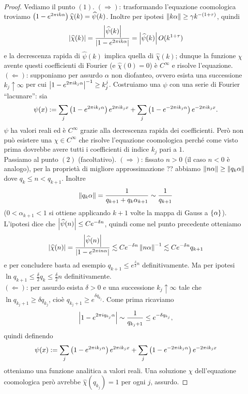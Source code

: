 \begin{proof}Vediamo il punto $(1)$. $(\Rightarrow)$: trasformando l'equazione coomologica troviamo
$\left(1-e^{2\pi i k\alpha}\right)\widehat{\chi}(k)=\widehat{\psi}(k)$. Inoltre per ipotesi
$\left\|k\alpha\right\|\ge\gamma k^{-(1+\tau)}$, quindi
\[ \left|\widehat{\chi}(k)\right|=\frac{\left|\widehat{\psi}(k)\right|}{\left|1-e^{2\pi i k\alpha}\right|}=\left|\widehat{\psi}(k)\right|O(k^{1+\tau}) \]
e la decrescenza rapida di $\widehat{\psi}(k)$ implica quella di $\widehat{\chi}(k)$;
dunque la funzione $\chi$ avente questi coefficienti di Fourier (e $\widehat{\chi}(0)=0$) è $C^\infty$ e risolve l'equazione. \\
$(\Leftarrow)$: supponiamo per assurdo $\alpha$ non diofanteo, ovvero esista una successione $k_j\uparrow\infty$
per cui $\left|1-e^{2\pi i k_j\alpha}\right|^{-1}\ge k_j^j$. Costruiamo una $\psi$ con una serie di Fourier ``lacunare'': sia
\[ \psi(x):=\sum_j \left(1-e^{2\pi i k_j\alpha}\right)e^{2\pi i k_j x}+\sum_j \left(1-e^{-2\pi i k_j\alpha}\right)e^{-2\pi i k_j x}. \]
$\psi$ ha valori reali ed è $C^\infty$ grazie alla decrescenza rapida dei coefficienti.
Però non può esistere una $\chi\in C^\infty$ che risolve l'equazione coomologica perché come visto prima
dovrebbe avere tutti i coefficienti di indice $k_j$ pari a $1$. \\
Passiamo al punto $(2)$ (facoltativo). $(\Rightarrow)$: fissato $n>0$ (il caso $n<0$ è analogo), per la proprietà di migliore approssimazione ??
abbiamo $\left\|n\alpha\right\|\ge\left\|q_k\alpha\right\|$ dove $q_k\le n<q_{k+1}$. Inoltre
\[ \left\|q_k\alpha\right\|=\frac{1}{q_{k+1}+q_k\alpha_{k+1}}\sim\frac{1}{q_{k+1}} \]
($0<\alpha_{k+1}<1$ si ottiene applicando $k+1$ volte la mappa di Gauss a $\left\{\alpha\right\}$).
L'ipotesi dice che $\left|\widehat{\psi}(n)\right|\le Ce^{-\delta n}$, quindi come nel punto precedente otteniamo
\[ \left|\widehat{\chi}(n)\right|=\frac{\left|\widehat{\psi}(n)\right|}{\left|1-e^{2\pi i n\alpha}\right|}\lesssim Ce^{-\delta n}\left\|n\alpha\right\|^{-1}
\lesssim Ce^{-\delta n}q_{k+1} \]
e per concludere basta ad esempio $q_{k+1}\le e^{\frac{\delta}{2}n}$ definitivamente.
Ma per ipotesi $\ln q_{k+1}\le \frac{\delta}{2}q_k\le\frac{\delta}{2}n$ definitivamente. \\
$(\Leftarrow)$: per assurdo esista $\delta>0$ e una successione $k_j\uparrow\infty$ tale che
$\ln q_{k_j+1}\ge\delta q_{k_j}$, cioè $q_{k_j+1}\ge e^{\delta q_{k_j}}$. Come prima ricaviamo
\[ \left|1-e^{2\pi i q_{k_j}\alpha}\right|\sim\frac{1}{q_{k_j+1}}\le e^{-\delta q_{k_j}}, \]
quindi definendo
\[ \psi(x):=\sum_j \left(1-e^{2\pi i k_j\alpha}\right)e^{2\pi i k_j x}+\sum_j \left(1-e^{-2\pi i k_j\alpha}\right)e^{-2\pi i k_j x} \]
otteniamo una funzione analitica a valori reali. Una soluzione $\chi$ dell'equazione coomologica però avrebbe
$\widehat{\chi}(q_{k_j})=1$ per ogni $j$, assurdo.
\end{proof}

